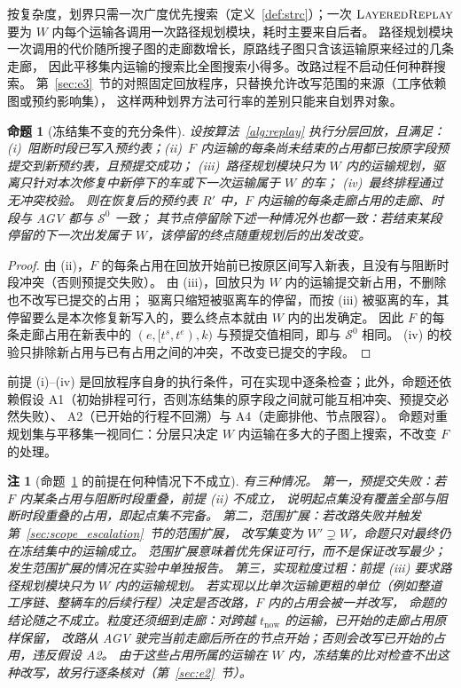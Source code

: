 \documentclass[manuscript,screen,review]{acmart}
\newtheorem{remark}{注}
\newtheorem{prop}{命题}
\begin{document}
按复杂度，划界只需一次广度优先搜索（定义~\ref{def:strc}）；一次 \(\textsc{LayeredReplay}\)
要为 \(W\) 内每个运输各调用一次路径规划模块，耗时主要来自后者。
路径规划模块一次调用的代价随所搜子图的走廊数增长，原路线子图只含该运输原来经过的几条走廊，
因此平移集内运输的搜索比全图搜索小得多。改路过程不启动任何种群搜索。
第~\ref{sec:e3}~节的对照固定回放程序，只替换允许改写范围的来源（工序依赖图或预约影响集），
这样两种划界方法可行率的差别只能来自划界对象。

\begin{prop}[冻结集不变的充分条件]
\label{prop:outside}
设按算法~\ref{alg:replay} 执行分层回放，且满足：
(i)~阻断时段已写入预约表；(ii)~\(F\) 内运输的每条尚未结束的占用都已按原字段预提交到新预约表，且预提交成功；
(iii)~路径规划模块只为 \(W\) 内的运输规划，驱离只针对本次修复中新停下的车或下一次运输属于 \(W\) 的车；
(iv)~最终排程通过无冲突校验。
则在恢复后的预约表 \(R'\) 中，\(F\) 内运输的每条走廊占用的走廊、时段与 AGV 都与 \(\mathcal{S}^0\) 一致；
其节点停留除下述一种情况外也都一致：若结束某段停留的下一次出发属于 \(W\)，该停留的终点随重规划后的出发改变。
\end{prop}

\begin{proof}
由 (ii)，\(F\) 的每条占用在回放开始前已按原区间写入新表，且没有与阻断时段冲突（否则预提交失败）。
由 (iii)，回放只为 \(W\) 内的运输提交新占用，不删除也不改写已提交的占用；
驱离只缩短被驱离车的停留，而按 (iii) 被驱离的车，其停留要么是本次修复新写入的，要么终点本就由 \(W\) 内的出发确定。
因此 \(F\) 的每条走廊占用在新表中的 \((e,[t^s,t^e),k)\) 与预提交值相同，即与 \(\mathcal{S}^0\) 相同。
(iv) 的校验只排除新占用与已有占用之间的冲突，不改变已提交的字段。
\end{proof}

前提 (i)--(iv) 是回放程序自身的执行条件，可在实现中逐条检查；此外，命题还依赖假设
A1（初始排程可行，否则冻结集的原字段之间就可能互相冲突、预提交必然失败）、
A2（已开始的行程不回溯）与 A4（走廊排他、节点限容）。
命题对重规划集与平移集一视同仁：分层只决定 \(W\) 内运输在多大的子图上搜索，不改变 \(F\) 的处理。

\begin{remark}[命题~\ref{prop:outside} 的前提在何种情况下不成立]
\label{rem:precommit}
有三种情况。
第一，预提交失败：若 \(F\) 内某条占用与阻断时段重叠，前提 (ii) 不成立，
说明起点集没有覆盖全部与阻断时段重叠的占用，即起点集不完备。
第二，范围扩展：若改路失败并触发第~\ref{sec:scope_escalation}~节的范围扩展，
改写集变为 \(W'\supsetneq W\)，命题只对最终仍在冻结集中的运输成立。
范围扩展意味着优先保证可行，而不是保证改写最少；发生范围扩展的情况在实验中单独报告。
第三，实现粒度过粗：前提 (iii) 要求路径规划模块\emph{只}为 \(W\) 内的运输规划。
若实现以比单次运输更粗的单位（例如整道工序链、整辆车的后续行程）决定是否改路，\(F\) 内的占用会被一并改写，
命题的结论随之不成立。粒度还须细到走廊：对跨越 \(t_{\mathrm{now}}\) 的运输，已开始的走廊占用原样保留，
改路从 AGV 驶完当前走廊后所在的节点开始；否则会改写已开始的占用，违反假设 A2。
由于这些占用所属的运输在 \(W\) 内，冻结集的比对检查不出这种改写，故另行逐条核对（第~\ref{sec:e2}~节）。
\end{remark}
\end{document}
